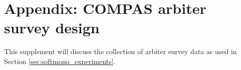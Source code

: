 \chapter{Appendix: COMPAS arbiter survey design}\label{ch:appendix_softmono}

    This supplement will discuss the collection of arbiter survey data as used in Section \ref{sec:softmono_experiments}. 
